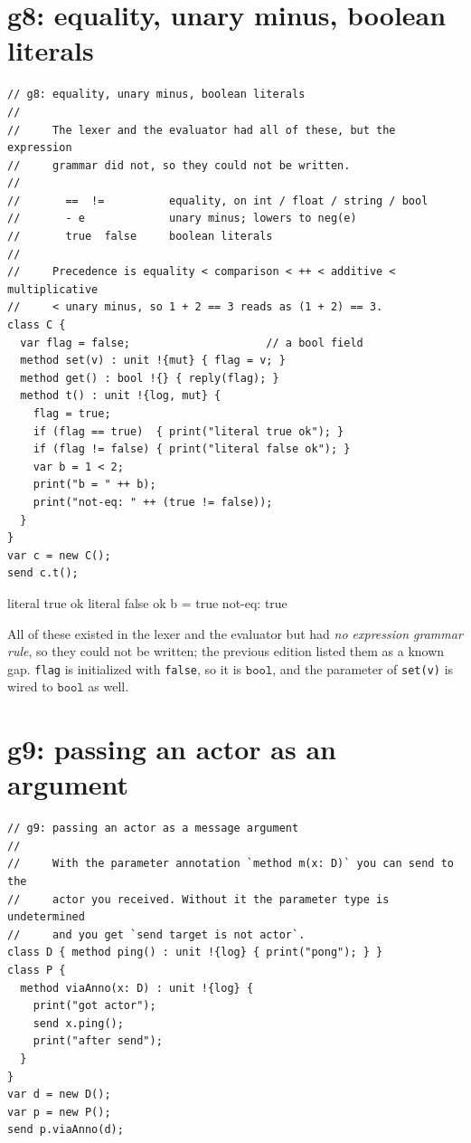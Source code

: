 \documentclass[11pt,a4paper]{article}
\newcommand{\ty}[1]{\ensuremath{\mathtt{#1}}}
\begin{document}
\section{g8: equality, unary minus, boolean literals}

\begin{lstlisting}
// g8: equality, unary minus, boolean literals
//
//     The lexer and the evaluator had all of these, but the expression
//     grammar did not, so they could not be written.
//
//       ==  !=          equality, on int / float / string / bool
//       - e             unary minus; lowers to neg(e)
//       true  false     boolean literals
//
//     Precedence is equality < comparison < ++ < additive < multiplicative
//     < unary minus, so 1 + 2 == 3 reads as (1 + 2) == 3.
class C {
  var flag = false;                     // a bool field
  method set(v) : unit !{mut} { flag = v; }
  method get() : bool !{} { reply(flag); }
  method t() : unit !{log, mut} {
    flag = true;
    if (flag == true)  { print("literal true ok"); }
    if (flag != false) { print("literal false ok"); }
    var b = 1 < 2;
    print("b = " ++ b);
    print("not-eq: " ++ (true != false));
  }
}
var c = new C();
send c.t();
\end{lstlisting}

\begin{term}
literal true ok
literal false ok
b = true
not-eq: true
\end{term}

All of these existed in the lexer and the evaluator but had \emph{no expression
grammar rule}, so they could not be written; the previous edition listed them
as a known gap. \texttt{flag} is initialized with \texttt{false}, so it is
\ty{bool}, and the parameter of \texttt{set(v)} is wired to \ty{bool} as well.

\section{g9: passing an actor as an argument}

\begin{lstlisting}
// g9: passing an actor as a message argument
//
//     With the parameter annotation `method m(x: D)` you can send to the
//     actor you received. Without it the parameter type is undetermined
//     and you get `send target is not actor`.
class D { method ping() : unit !{log} { print("pong"); } }
class P {
  method viaAnno(x: D) : unit !{log} {
    print("got actor");
    send x.ping();
    print("after send");
  }
}
var d = new D();
var p = new P();
send p.viaAnno(d);
\end{lstlisting}
\end{document}
